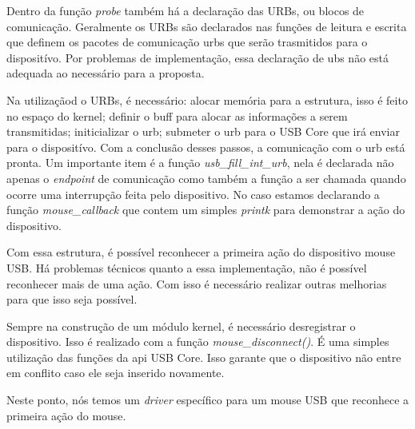 \lstset{style=shell}


Dentro da função \textit{probe} também há a declaração das URBs, ou blocos de comunicação.
Geralmente os URBs são declarados nas funções de leitura e escrita
que definem os pacotes de comunicação urbs que serão trasmitidos para o dispositívo.
Por problemas de implementação, essa declaração de ubs não está adequada ao necessário
para a proposta.

\lstset{style=shell}


Na utilizaçãod o URBs, é necessário: alocar memória para a estrutura, isso é feito no
espaço do kernel; definir o buff para alocar as informações a serem transmitidas;
initicializar o urb; submeter o urb para o USB Core que irá enviar para o dispositívo.
Com a conclusão desses passos, a comunicação com o urb está pronta. Um importante item
é a função \textit{usb\_fill\_int\_urb}, nela é declarada não apenas o \textit{endpoint} de comunicação
como também a função a ser chamada quando ocorre uma interrupção feita pelo dispositivo.
No caso estamos declarando a função \textit{mouse\_callback} que contem um simples \textit{printk} para
demonstrar a ação do dispositivo.

\lstset{style=shell}


Com essa estrutura, é possível reconhecer a primeira ação do dispositivo mouse USB.
Há problemas técnicos quanto a essa implementação, não é possível reconhecer
mais de uma ação. Com isso é necessário realizar outras melhorias para que isso
seja possível.

Sempre na construção de um módulo kernel, é necessário desregistrar o dispositivo.
Isso é realizado com a função \textit{mouse\_disconnect()}. É uma simples utilização das
funções da api USB Core. Isso garante que o dispositivo não entre em conflito
caso ele seja inserido novamente.

\lstset{style=shell}


Neste ponto, nós temos um \textit{driver} específico para um mouse USB que reconhece a primeira
ação do mouse.

